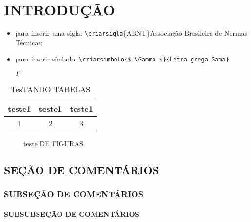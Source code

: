 \chapter[INTRODUÇÃO]{INTRODUÇÃO}



\begin{itemize}
 \item para inserir uma sigla: 
    \verb|\criarsigla|\{ABNT\}{Associa\c{c}\~ao Brasileira de Normas T\'ecnicas}:


\item para inserir s\'imbolo: 
    \verb|\criarsimbolo{$ \Gamma $}{Letra grega Gama}|
  
    $ \Gamma $ 

\end{itemize}


\begin{table}[!ht]
 \centering
 \par\caption{TesTANDO TABELAS}

\begin{tabular}{c|c|c}
 teste1&teste1&teste1\\\hline\hline
  1&2&3\\\hline
 \end{tabular}
 \label{tab:tab01}
\end{table}

\begin{figure}[!ht]
 \centering
 
 \caption{teste DE FIGURAS}
 \label{fig:01}
\end{figure}


\section{SEÇÃO DE COMENTÁRIOS}
\subsection{SUBSEÇÃO DE COMENTÁRIOS}
\subsubsection{SUBSUBSEÇÃO DE COMENTÁRIOS}
